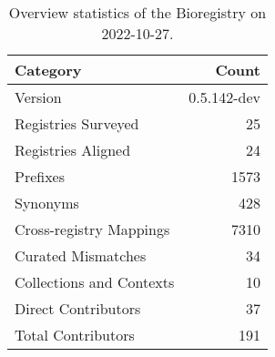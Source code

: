 \begin{table}
\centering
\caption{Overview statistics of the Bioregistry on 2022-10-27.}
\label{tab:bioregistry-summary}
\begin{tabular}{lr}
\toprule
                Category &       Count \\
\midrule
                 Version & 0.5.142-dev \\
     Registries Surveyed &          25 \\
      Registries Aligned &          24 \\
                Prefixes &        1573 \\
                Synonyms &         428 \\
 Cross-registry Mappings &        7310 \\
      Curated Mismatches &          34 \\
Collections and Contexts &          10 \\
     Direct Contributors &          37 \\
      Total Contributors &         191 \\
\bottomrule
\end{tabular}
\end{table}
